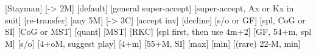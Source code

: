 \begin{bidsemi}
[Stayman]
[-> 2M]
    [default]
    [general super-accept]
    [super-accept, Ax or Kx in suit]
        [re-transfer]
    [any 5M]
[-> 3C]
    [accept inv]
    [decline]
[s/o or GF]
    [spl, CoG or SI]
    [CoG or MST]
    [quant]
    [MST]
    [RKC]
    [spl first, then use 4m+2]
[GF, 54+m, spl M]
    [s/o]
    [4+oM, suggest play]
    [4+m]
[55+M, SI]
    [max]
    [min]
    [(rare) 22-M, min]
\end{bidsemi}